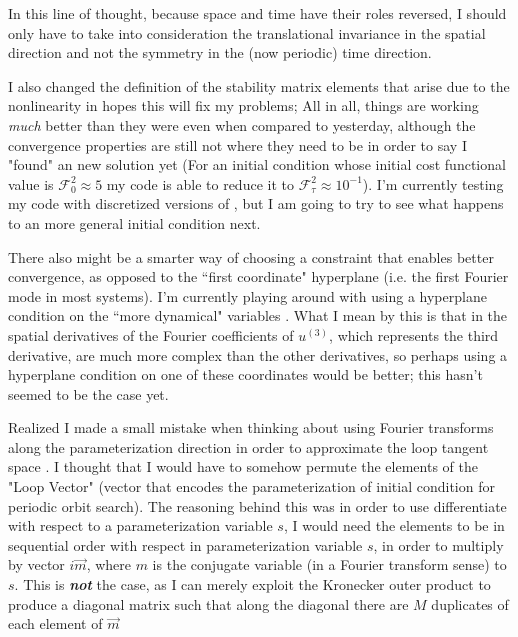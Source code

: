 In this line of thought, because space and time have their roles
reversed, I should only have to take into consideration the translational
invariance in the spatial direction and not the  symmetry in the (now periodic)
time direction.

I also changed the definition of the stability matrix elements that arise due
to the nonlinearity in hopes this will fix my problems; All in all, things are
working \emph{much} better than they were even when compared to yesterday,
although the convergence properties are still not where they need to be in
order to say I "found" an new solution yet (For an initial condition whose
initial cost functional value is $\mathcal{F}_0^2 \approx 5$ my code is able to
reduce it to $\mathcal{F}_{\tau}^2 \approx 10^{-1}$). I'm currently testing my
code with discretized versions of , but I am going to try to see what
happens to an more general initial condition next.

There also might be a smarter way of choosing a constraint that enables better
convergence, as opposed to the ``first coordinate" hyperplane (i.e. the first
Fourier mode in most systems). I'm currently playing around with using a
hyperplane condition on the ``more dynamical" variables . What I mean by this is that in
 the spatial derivatives of the Fourier coefficients of
$u^{(3)}$, which represents the third derivative, are much more complex than
the other derivatives, so perhaps using a hyperplane condition on one of these
coordinates would be better; this hasn't seemed to be the case yet.

Realized I made a small mistake when thinking about using Fourier transforms along
the parameterization direction in order to approximate the loop tangent space .
I thought that I would have to somehow permute the elements  of the "Loop Vector" (vector that
encodes the parameterization of initial condition for periodic orbit search). The reasoning behind this
was in order to use differentiate with respect to a parameterization variable $s$, I would need
the elements to be in sequential order with respect in parameterization variable $s$, in order to
multiply by vector $i \vec{m}$, where $m$ is the conjugate variable (in a Fourier transform sense)
to $s$. This is \textbf{\emph{not}}
the case, as I can merely exploit the Kronecker outer product to produce a diagonal matrix such that
along the diagonal there are $M$ duplicates of each element of $\vec{m}$

